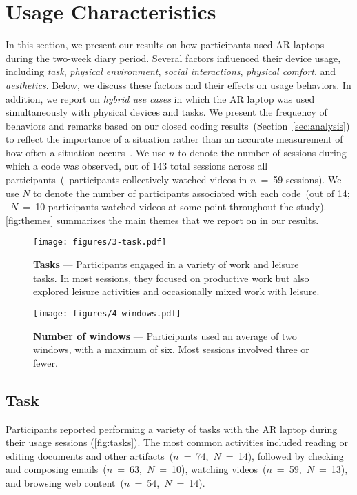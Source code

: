 \section{Usage Characteristics}
In this section, we present our results on how participants used AR laptops during the two-week diary period. 
Several factors influenced their device usage, including \emph{task}, 
\emph{physical environment}, \emph{social interactions}, 
\emph{physical comfort}, 
and \emph{aesthetics}. 
Below, we discuss these factors and their effects on usage behaviors.
In addition, we report on \emph{hybrid use cases} in which the AR laptop was used simultaneously with physical devices and tasks. 
We present the frequency of behaviors and remarks based on our closed coding results~(Section~\ref{sec:analysis}) to reflect the importance of a situation rather than an accurate measurement of how often a situation occurs~\cite{myers2016programmers}.
We use $n$ to denote the number of sessions during which a code was observed, out of 143 total sessions across all participants~(\eg~participants collectively watched videos in $n$~=~59 sessions).
We use $N$ to denote the number of participants associated with each code~(out of 14; \eg~$N$~=~10 participants watched videos at some point throughout the study).
\autoref{fig:themes} summarizes the main themes that we report on in our results.

\begin{figure}[t]
    \centering
    \texttt{[image: figures/3-task.pdf]}
    \caption{\textbf{Tasks} --- Participants engaged in a variety of work and leisure tasks. In most sessions, they focused on productive work but also explored leisure activities and occasionally mixed work with leisure.}
    \label{fig:tasks}
\end{figure}

\begin{figure}[t]
    \centering
    \texttt{[image: figures/4-windows.pdf]}
    \caption{\textbf{Number of windows} --- Participants used an average of two windows, with a maximum of six. Most sessions involved three or fewer.}
    \label{fig:windows}
\end{figure}

\subsection{Task}
Participants reported performing a variety of tasks with the AR laptop during their usage sessions (\autoref{fig:tasks}).
The most common activities included reading or editing documents and other artifacts~($n$~=~74,~$N$~=~14), 
followed by checking and composing emails~($n$~=~63,~$N$~=~10),
watching videos~($n$~=~59,~$N$~=~13), 
and browsing web content~($n$~=~54,~$N$~=~14).

